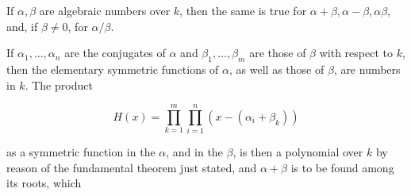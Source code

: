 If $\alpha, \beta$ are algebraic numbers over $k$, then the same is true for $\alpha + \beta, \alpha - \beta, \alpha\beta$, and, if $\beta \neq 0$, for $\alpha/\beta$.

If $\alpha_1, \ldots, \alpha_n$ are the conjugates of $\alpha$ and $\beta_1, \ldots, \beta_m$ are those of $\beta$ with respect to $k$, then the elementary symmetric functions of $\alpha$, as well as those of $\beta$, are numbers in $k$. The product

$$H(x) = \prod_{k=1}^{m} \prod_{i=1}^{n} (x - (\alpha_i + \beta_k))$$

as a symmetric function in the $\alpha$, and in the $\beta$, is then a polynomial over $k$ by reason of the fundamental theorem just stated, and $\alpha + \beta$ is to be found among its roots, which

